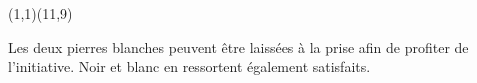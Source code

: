 \documentclass[preview, border=0pt, varwidth=false]{standalone}
\begin{document}
	\setgounit{0.6cm} 
	
\parbox[c][14.65cm][c]{10.2cm}{
	\centering
	

	\begin{psgopartialboard}{(1,1)(11,9)}
		\pass
		\pass*
	\end{psgopartialboard}
	
	\vspace{1em}
	Les deux pierres blanches peuvent être laissées à la prise afin de profiter de l'initiative. Noir et blanc en ressortent également satisfaits. 
	}
\end{document}

